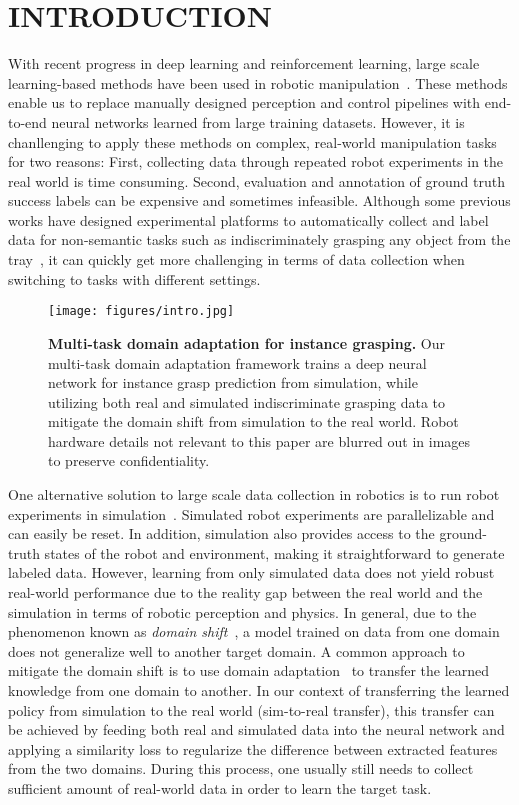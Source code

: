 \documentclass[letterpaper, 10 pt, conference]{ieeeconf}  %
\begin{document}
\section{INTRODUCTION}
With recent progress in deep learning and reinforcement learning, large scale learning-based methods have been used in robotic manipulation~\cite{levine2016learning,gupta,kappler}. These methods enable us to replace manually designed perception and control pipelines with end-to-end neural networks learned from large training datasets. However, it is chanllenging to apply these methods on complex, real-world manipulation tasks for two reasons: First, collecting data through repeated robot experiments in the real world is time consuming. Second, evaluation and annotation of ground truth success labels can be expensive and sometimes infeasible. Although some previous works have designed experimental platforms to automatically collect and label data for non-semantic tasks such as indiscriminately grasping any object from the tray~\cite{levine2016learning}, it can quickly get more challenging in terms of data collection when switching to tasks with different settings.
\begin{figure}[ht]
\centering
\texttt{[image: figures/intro.jpg]}
\caption{\textbf{Multi-task domain adaptation for instance grasping.} Our multi-task domain adaptation framework trains a deep neural network for instance grasp prediction from simulation, while utilizing both real and simulated indiscriminate grasping data to mitigate the domain shift from simulation to the real world. Robot hardware details not relevant to this paper are blurred out in images to preserve confidentiality.}
\label{fig:intro}
\vspace{-6mm}
\end{figure}

One alternative solution to large scale data collection in robotics is to run robot experiments in simulation~\cite{saxena2008robotic,rusu2016sim,tobin2017domain,james2017transferring,mahler2017dex,viereck2017learning}. Simulated robot experiments are parallelizable and can easily be reset. In addition, simulation also provides access to the ground-truth states of the robot and environment, making it straightforward to generate labeled data. However, learning from only simulated data does not yield robust real-world performance due to the reality gap between the real world and the simulation in terms of robotic perception and physics. In general, due to the phenomenon known as \textit{domain shift}~\cite{quinonero2008covariate}, a model trained on data from one domain does not generalize well to another target domain. A common approach to mitigate the domain shift is to use domain adaptation~\cite{pan2010survey} to transfer the learned knowledge from one domain to another. In our context of transferring the learned policy from simulation to the real world (sim-to-real transfer), this transfer can be achieved by feeding both real and simulated data into the neural network and applying a similarity loss to regularize the difference between extracted features from the two domains. During this process, one usually still needs to collect sufficient amount of real-world data in order to learn the target task.
\end{document}
